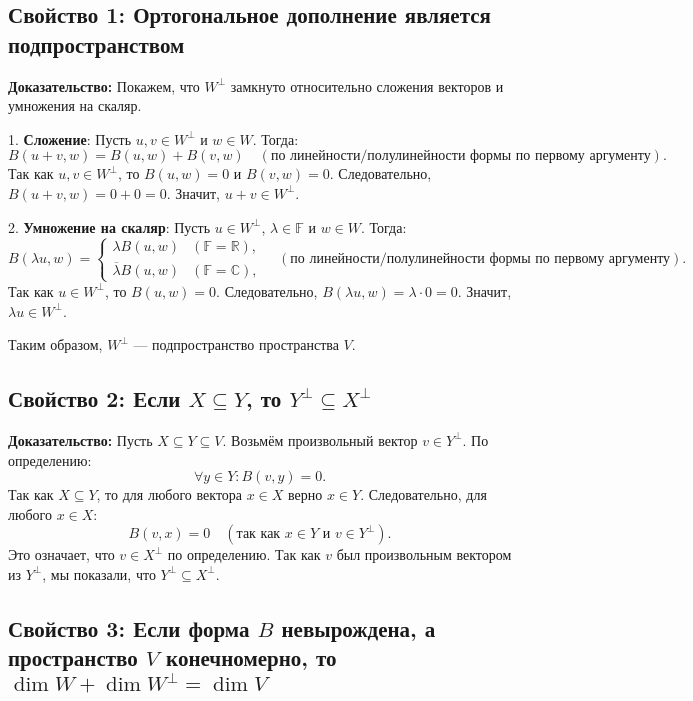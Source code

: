 \documentclass[12pt]{article}
\begin{document}
\subsection*{Свойство 1: Ортогональное дополнение является подпространством}

\textbf{Доказательство:}  
Покажем, что $W^\perp$ замкнуто относительно сложения векторов и умножения на скаляр.

1. \textbf{Сложение}:  
   Пусть $u, v \in W^\perp$ и $w \in W$. Тогда:  
   $$
   B(u + v, w) = B(u, w) + B(v, w) \quad (\text{по линейности/полулинейности формы по первому аргументу}).
   $$  
   Так как $u, v \in W^\perp$, то $B(u, w) = 0$ и $B(v, w) = 0$. Следовательно, $B(u + v, w) = 0 + 0 = 0$. Значит, $u + v \in W^\perp$.

2. \textbf{Умножение на скаляр}:  
   Пусть $u \in W^\perp$, $\lambda \in \mathbb{F}$ и $w \in W$. Тогда:  
   $$
   B(\lambda u, w) = 
   \begin{cases}
   \lambda B(u, w) & (\mathbb{F} = \mathbb{R}), \\
   \overline{\lambda} B(u, w) & (\mathbb{F} = \mathbb{C}),
   \end{cases}
   \quad (\text{по линейности/полулинейности формы по первому аргументу}).
   $$  
   Так как $u \in W^\perp$, то $B(u, w) = 0$. Следовательно, $B(\lambda u, w) = \lambda \cdot 0 = 0$. Значит, $\lambda u \in W^\perp$.

Таким образом, $W^\perp$ — подпространство пространства $V$.


\subsection*{Свойство 2: Если $X \subseteq Y$, то $Y^\perp \subseteq X^\perp$}

\textbf{Доказательство:}  
Пусть $X \subseteq Y \subseteq V$. Возьмём произвольный вектор $v \in Y^\perp$. По определению:  
$$
\forall y \in Y : B(v, y) = 0.
$$  
Так как $X \subseteq Y$, то для любого вектора $x \in X$ верно $x \in Y$. Следовательно, для любого $x \in X$:  
$$
B(v, x) = 0 \quad (\text{так как } x \in Y \text{ и } v \in Y^\perp).
$$  
Это означает, что $v \in X^\perp$ по определению. Так как $v$ был произвольным вектором из $Y^\perp$, мы показали, что $Y^\perp \subseteq X^\perp$.



\subsection*{Свойство 3: Если форма $B$ невырождена, а пространство $V$ конечномерно, то $\dim W + \dim W^\perp = \dim V$}
\end{document}
